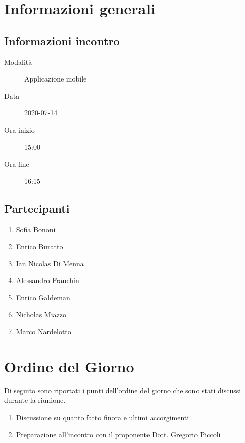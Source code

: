 \documentclass{article}
\begin{document}


\section{Informazioni generali}%
\label{sec:informazioni_generali}

\subsection{Informazioni incontro}%
\label{sub:informazioni_incontro}

\begin{description}
  \item[Modalità] Applicazione mobile 
  \item[Data] 2020-07-14
  \item[Ora inizio] 15:00
  \item[Ora fine] 16:15
\end{description}

\subsection{Partecipanti}%
\label{sub:partecipanti}

\begin{enumerate}
  \item Sofia Bononi
  \item Enrico Buratto
  \item Ian Nicolas Di Menna
  \item Alessandro Franchin
  \item Enrico Galdeman
  \item Nicholas Miazzo
  \item Marco Nardelotto
\end{enumerate}

\section{Ordine del Giorno}%
\label{ordine_del_giorno}
Di seguito sono riportati i punti dell'ordine del giorno che sono stati discussi durante la riunione.
\begin{enumerate}
  \item Discussione su quanto fatto finora e ultimi accorgimenti
  \item Preparazione all'incontro con il proponente Dott. Gregorio Piccoli
\end{enumerate}
\end{document}
